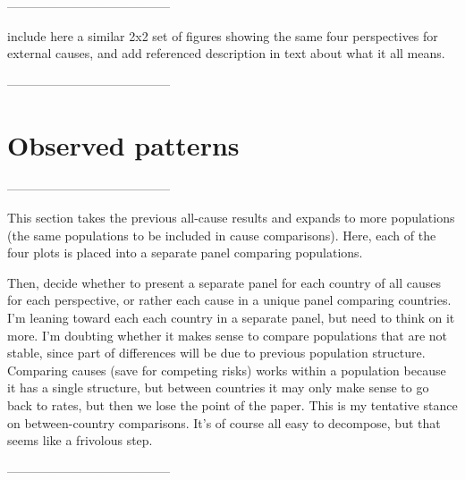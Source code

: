 \documentclass{article}
\begin{document}
---------------------------------------

include here a similar 2x2 set of figures showing the same four perspectives for
external causes, and add referenced description in text about what it all means.

---------------------------------------
\section{Observed patterns}
---------------------------------------

This section takes the previous all-cause results and expands to more
populations (the same populations to be included in cause comparisons). Here,
each of the four plots is placed into a separate panel comparing populations.

Then, decide whether to present a separate panel for each country of all causes
for each perspective, or rather each cause in a unique panel comparing
countries. I'm leaning toward each each country in a separate panel, but need to
think on it more. I'm doubting whether it makes sense to compare populations
that are not stable, since part of differences will be due to previous
population structure. Comparing causes (save for competing risks) works within a
population because it has a single structure, but between countries it may only
make sense to go back to rates, but then we lose the point of the paper. This is
my tentative stance on between-country comparisons. It's of course all easy to
decompose, but that seems like a frivolous step.

---------------------------------------

    
\end{document}
